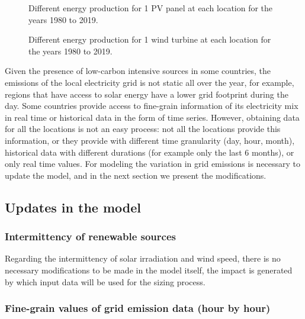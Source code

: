 \begin{figure}[H]
  \centering
  {}
  \caption{Different energy production for 1 PV panel at each location for the years 1980 to 2019.}
  \label{fig:pv_boxplots}
\end{figure}


\begin{figure}[H]
  \centering
  {}
  \caption{Different energy production for 1 wind turbine at each location for the years 1980 to 2019.}
  \label{fig:wt_boxplots}
\end{figure}



Given the presence of low-carbon intensive sources in some countries, the emissions of the local electricity grid is not static all over the year, for example, regions that have access to solar energy have a lower grid footprint during the day. Some countries provide access to fine-grain information of its electricity mix in real time or historical data in the form of time series. However, obtaining data for all the locations is not an easy process: not all the locations provide this information, or they provide with different time granularity (day, hour, month), historical data with different durations (for example only the last 6 months), or only real time values. For modeling the variation in grid emissions is necessary to update the model, and in the next section we present the modifications.


\subsection{Updates in the model}

\subsubsection{Intermittency of renewable sources}

Regarding the intermittency of solar irradiation and wind speed, there is no necessary modifications to be made in the model itself, the impact is generated by which input data will be used for the sizing process.

\subsubsection{Fine-grain values of grid emission data (hour by hour)}

